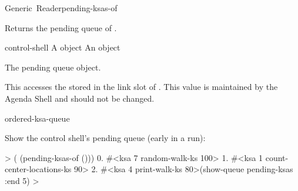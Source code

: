 \documentclass[10pt,twoside,english,pdftex]{article}
\begin{document}

\begin{functiondoc}{Generic~Reader}{pending-ksas-of}{ 
    \returns{} }
%
%

\fnsyntax

\fnpurpose Returns the pending  queue of .

\fnmethods
{}

\fnpackage {}

\fnmodule {}

\fnargs
\begin{args}{control-shell}
 A  object
 An \textbf{} object
\end{args}

\fnreturns The pending  queue object.

\fndescription 
%
This  accesses the
\textbf{} stored in the  link
slot of . This value is maintained by the Agenda Shell and should not
be changed.

\begin{alsos}{ordered-ksa-queue}
\also[ksa]
\also[on-queue-p]
\end{alsos}

\fnexample
%
%
%
%
%
Show the control shell's pending  queue (early in a
 run):
%
\W\supp
\begin{example}
  >  ( (pending-ksas-of ()))
      0. #<ksa 7 random-walk-ks 100>
      1. #<ksa 1 count-center-locations-ks 90>
      2. #<ksa 4 print-walk-ks 80>(show-queue pending-ksas :end 5)
  >
\end{example}

\end{functiondoc}

\end{document}
